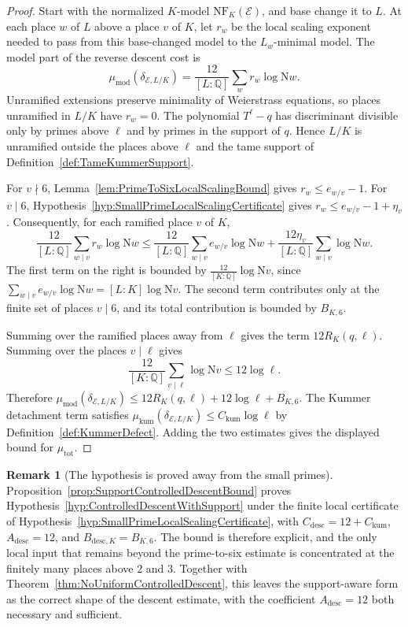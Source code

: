 \documentclass[10pt, reqno]{amsart}
\theoremstyle{plain}
\theoremstyle{definition}
\newtheorem{remark}[theorem]{Remark}
\theoremstyle{plain}
\newcommand{\Q}{\mathbb{Q}}
\begin{document}
\begin{proof}
Start with the normalized $K$-model $\mathrm{NF}_{K}(\mathcal{E})$, and base change it to $L$. At each place $w$ of $L$ above a place $v$ of $K$, let $r_{w}$ be the local scaling exponent needed to pass from this base-changed model to the $L_{w}$-minimal model. The model part of the reverse descent cost is
\[
  \mu_{\mathrm{mod}}(\delta_{\mathcal{E},L/K})
  =
  \frac{12}{[L:\Q]}
  \sum_{w}
  r_{w}\log \mathrm{N}w.
\]
Unramified extensions preserve minimality of Weierstrass equations, so places unramified in $L/K$ have $r_{w}=0$. The polynomial $T^{\ell}-q$ has discriminant divisible only by primes above $\ell$ and by primes in the support of $q$. Hence $L/K$ is unramified outside the places above $\ell$ and the tame support of Definition~\ref{def:TameKummerSupport}.

For $v\nmid 6$, Lemma~\ref{lem:PrimeToSixLocalScalingBound} gives $r_{w}\le e_{w/v}-1$. For $v\mid 6$, Hypothesis~\ref{hyp:SmallPrimeLocalScalingCertificate} gives $r_{w}\le e_{w/v}-1+\eta_{v}$. Consequently, for each ramified place $v$ of $K$,
\[
  \frac{12}{[L:\Q]}
  \sum_{w\mid v}
  r_{w}\log \mathrm{N}w
  \le
  \frac{12}{[L:\Q]}
  \sum_{w\mid v}
  e_{w/v}\log \mathrm{N}w
  +
  \frac{12\eta_{v}}{[L:\Q]}
  \sum_{w\mid v}
  \log \mathrm{N}w.
\]
The first term on the right is bounded by $\tfrac{12}{[K:\Q]}\log \mathrm{N}v$, since $\sum_{w\mid v}e_{w/v}\log\mathrm{N}w=[L:K]\log\mathrm{N}v$. The second term contributes only at the finite set of places $v\mid 6$, and its total contribution is bounded by $B_{K,6}$.

Summing over the ramified places away from $\ell$ gives the term $12R_{K}(q,\ell)$. Summing over the places $v\mid \ell$ gives
\[
  \frac{12}{[K:\Q]}
  \sum_{v\mid \ell}\log \mathrm{N}v
  \le
  12\log \ell.
\]
Therefore $\mu_{\mathrm{mod}}(\delta_{\mathcal{E},L/K})\le 12R_{K}(q,\ell)+12\log \ell+B_{K,6}$. The Kummer detachment term satisfies $\mu_{\mathrm{kum}}(\delta_{\mathcal{E},L/K})\le C_{\mathrm{kum}}\log \ell$ by Definition~\ref{def:KummerDefect}. Adding the two estimates gives the displayed bound for $\mu_{\mathrm{tot}}$.
\end{proof}

\begin{remark}[The hypothesis is proved away from the small primes]\label{rem:SupportHypothesisProved}
Proposition~\ref{prop:SupportControlledDescentBound} proves Hypothesis~\ref{hyp:ControlledDescentWithSupport} under the finite local certificate of Hypothesis~\ref{hyp:SmallPrimeLocalScalingCertificate}, with $C_{\mathrm{desc}}=12+C_{\mathrm{kum}}$, $A_{\mathrm{desc}}=12$, and $B_{\mathrm{desc},K}=B_{K,6}$. The bound is therefore explicit, and the only local input that remains beyond the prime-to-six estimate is concentrated at the finitely many places above $2$ and $3$. Together with Theorem~\ref{thm:NoUniformControlledDescent}, this leaves the support-aware form as the correct shape of the descent estimate, with the coefficient $A_{\mathrm{desc}}=12$ both necessary and sufficient.
\end{remark}
\end{document}
